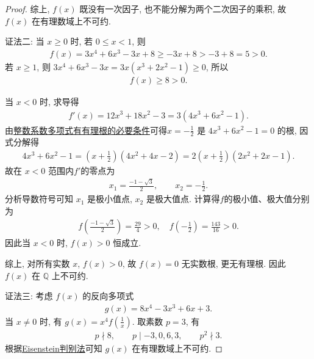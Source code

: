 \documentclass[../../main.tex]{subfiles}%
\begin{document}
\begin{proof}
综上, \( f(x) \) 既没有一次因子, 也不能分解为两个二次因子的乘积, 故 \( f(x) \) 在有理数域上不可约.

{\color{blue}证法二:}
当 \( x \geqslant 0 \) 时,
若 \( 0 \leqslant x < 1 \), 则
\begin{align*}
f(x) = 3x^{4} + 6x^{3} - 3x + 8 \geqslant -3x + 8 > -3 + 8 = 5 > 0.
\end{align*}
若 \( x \geqslant 1 \), 则 \( 3x^{4} + 6x^{3} - 3x = 3x(x^{3} + 2x^{2} - 1) \geqslant 0 \), 所以
\begin{align*}
f(x) \geqslant 8 > 0.
\end{align*}

当 \( x < 0 \) 时, 求导得
\begin{align*}
f'(x) = 12x^{3} + 18x^{2} - 3 = 3(4x^{3} + 6x^{2} - 1).
\end{align*}
由\hyperref[theorem:整数系数多项式有有理根的必要条件]{整数系数多项式有有理根的必要条件}可得\( x = -\frac12 \) 是 \( 4x^{3} + 6x^{2} - 1 = 0 \) 的根, 因式分解得
\begin{align*}
4x^{3} + 6x^{2} - 1 = (x + \tfrac12)(4x^{2} + 4x - 2) = 2(x + \tfrac12)(2x^{2} + 2x - 1).
\end{align*}
故在 \( x < 0 \) 范围内$f'$的零点为
\begin{align*}
x_1 = \frac{-1 - \sqrt{3}}{2},\qquad x_2 = -\frac12.
\end{align*}
分析导数符号可知 \( x_1 \) 是极小值点, \( x_2 \) 是极大值点. 计算得$f$的极小值、极大值分别为
\begin{align*}
f\left(\frac{-1 - \sqrt{3}}{2}\right) = \frac{29}{4} > 0,\quad f(-\frac12) = \frac{143}{16} > 0.
\end{align*}
因此当 \( x < 0 \) 时, \( f(x) > 0 \) 恒成立.

综上, 对所有实数 \( x \), \( f(x) > 0 \), 故 \( f(x) = 0 \) 无实数根, 更无有理根. 因此 \( f(x) \) 在 \( \mathbb{Q} \) 上不可约.

{\color{blue}证法三:}
考虑 \( f(x) \) 的反向多项式
\begin{align*}
g(x) = 8x^{4} - 3x^{3} + 6x + 3.
\end{align*}
当 \( x \neq 0 \) 时, 有 \( g(x) = x^{4} f(\frac{1}{x}) \). 取素数 \( p = 3 \), 有
\begin{align*}
p \nmid 8,\qquad p \mid -3,0,6,3,\qquad p^{2} \nmid 3.
\end{align*}
根据\hyperref[theorem:Eisenstein判别法]{Eisenstein判别法}可知 \( g(x) \) 在有理数域上不可约.


\end{proof}
\end{document}

